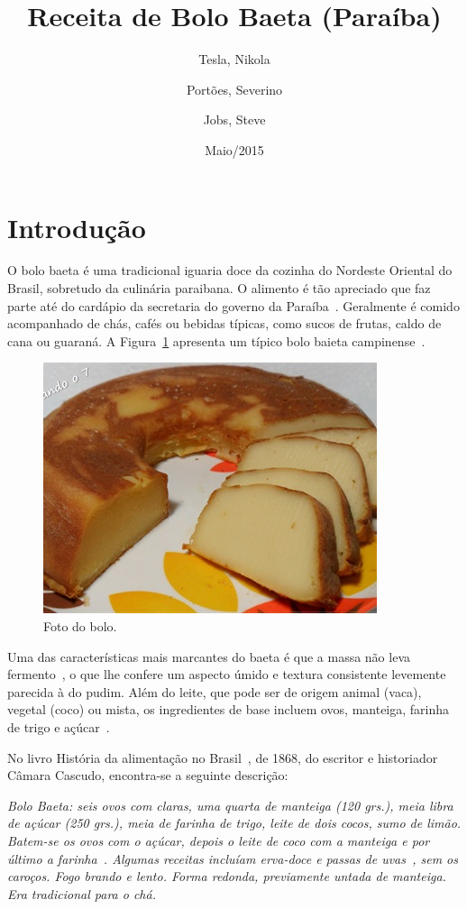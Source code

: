 \documentclass[a4paper,11pt,twocolumn]{article}
\title{Receita de Bolo Baeta (Paraíba)}
\author{Tesla, Nikola \and Portões, Severino \and Jobs, Steve}
\date{Maio/2015}
\begin{document}
\maketitle
\tableofcontents

\section{Introdução}
O bolo baeta é uma tradicional iguaria doce da cozinha do Nordeste Oriental do Brasil, sobretudo da culinária paraibana. O alimento é tão apreciado que faz parte até do cardápio da secretaria do governo da Paraíba~\cite{Sommerville:2004}. Geralmente é comido acompanhado de chás, cafés ou bebidas típicas, como sucos de frutas, caldo de cana ou guaraná. A Figura~\ref{fig_do_bolo} apresenta um típico bolo baieta campinense~\cite{Pressman:2007}.

\begin{figure}[h!]
  \begin{center}
    \includegraphics[width=0.4 \textwidth]{bolo.jpg}
    \caption{Foto do bolo.}
    \label{fig_do_bolo}
  \end{center}
\end{figure}

Uma das características mais marcantes do baeta é que a massa não leva fermento~\cite{Chavent:2003}, o que lhe confere um aspecto úmido e textura consistente levemente parecida à do pudim. Além do leite, que pode ser de origem animal (vaca), vegetal (coco) ou mista, os ingredientes de base incluem ovos, manteiga, farinha de trigo e açúcar~\cite{Saporta:1990}.

No livro História da alimentação no Brasil~\cite{Diday:1982}, de 1868, do escritor e historiador Câmara Cascudo, encontra-se a seguinte descrição:

\begin{center}
  \textit{Bolo Baeta: seis ovos com claras, uma quarta de manteiga (120 grs.), meia libra de açúcar (250 grs.), meia de farinha de trigo, leite de dois cocos, sumo de limão. Batem-se os ovos com o açúcar, depois o leite de coco com a manteiga e por último a farinha~\cite{Bock:1978}. Algumas receitas incluíam erva-doce e passas de uvas~\cite{Neto:2010}, sem os caroços. Fogo brando e lento. Forma redonda, previamente untada de manteiga. Era tradicional para o chá.}
\end{center}
\end{document}
